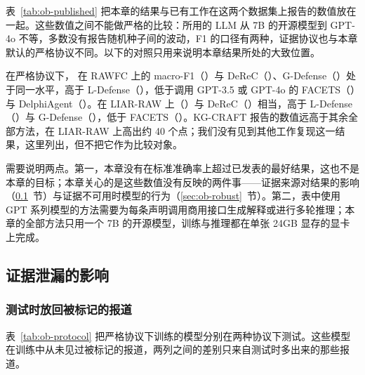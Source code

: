表~\ref{tab:ob-published} 把本章的结果与已有工作在这两个数据集上报告的数值放在一起。这些数值之间不能做严格的比较：所用的 LLM 从 7B 的开源模型到 GPT-4o 不等，多数没有报告随机种子间的波动，F1 的口径有两种，证据协议也与本章默认的严格协议不同。以下的对照只用来说明本章结果所处的大致位置。

在严格协议下，\ours{} 在 RAWFC 上的 macro-F1（）与 DeReC（）、G-Defense（）处于同一水平，高于 L-Defense（），低于调用 GPT-3.5 或 GPT-4o 的 FACETS（）与 DelphiAgent（）。在 LIAR-RAW 上（）与 DeReC（）相当，高于 L-Defense（）与 G-Defense（），低于 FACETS（）。KG-CRAFT 报告的数值远高于其余全部方法，在 LIAR-RAW 上高出约 40 个点；我们没有见到其他工作复现这一结果，这里列出，但不把它作为比较对象。


需要说明两点。第一，本章没有在标准准确率上超过已发表的最好结果，这也不是本章的目标；本章关心的是这些数值没有反映的两件事——证据来源对结果的影响（\ref{sec:ob-leak}~节）与证据不可用时模型的行为（\ref{sec:ob-robust}~节）。第二，表中使用 GPT 系列模型的方法需要为每条声明调用商用接口生成解释或进行多轮推理；本章的全部方法只用一个 7B 的开源模型，训练与推理都在单张 24GB 显存的显卡上完成。

\subsection{证据泄漏的影响}\label{sec:ob-leak}

\begin{table}[htbp]
\centering\small
\caption{严格协议下训练的模型在两种测试协议下的结果（\%）}\label{tab:ob-protocol}
\end{table}

\subsubsection{测试时放回被标记的报道}
表~\ref{tab:ob-protocol} 把严格协议下训练的模型分别在两种协议下测试。这些模型在训练中从未见过被标记的报道，两列之间的差别只来自测试时多出来的那些报道。

